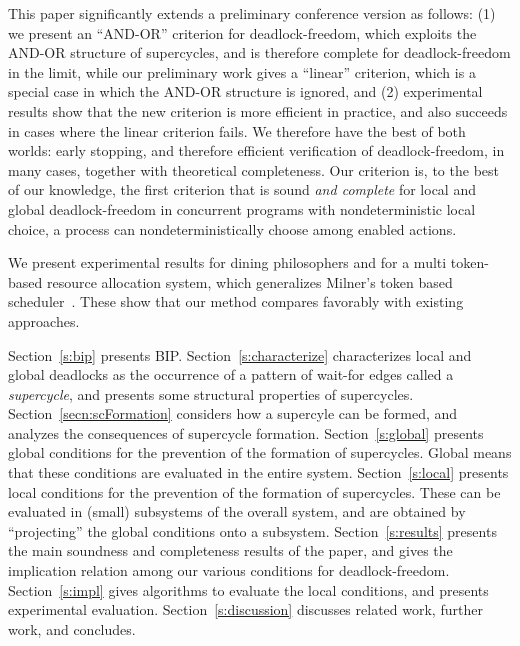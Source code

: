 This paper significantly extends a preliminary conference version \cite{FORTE13} as
follows: 
(1) we present an ``AND-OR'' criterion for deadlock-freedom, which exploits the AND-OR structure of supercycles, and is therefore complete for
deadlock-freedom in the limit, while our preliminary work \cite{FORTE13} gives a ``linear'' criterion, which is a special case in which the AND-OR structure is ignored, and
(2) experimental results show that the new criterion is more efficient
in practice, and also succeeds in cases where the linear criterion
fails.
We therefore have the best of both worlds: early stopping, and
therefore efficient verification of deadlock-freedom, in many cases,
together with theoretical completeness.
%
Our criterion is, to the best of our knowledge, the first criterion that is sound \emph{and complete} for local and global deadlock-freedom in
concurrent programs with nondeterministic local choice, \ie a process can nondeterministically choose among enabled actions.

We present experimental results for dining philosophers and for a multi token-based resource allocation system, which generalizes Milner's token based
scheduler~\cite{milner}.  These show that our method compares favorably with existing approaches.







Section~\ref{s:bip} presents BIP.  
Section~\ref{s:characterize} characterizes local and global
deadlocks as the occurrence of a pattern of wait-for edges called a
\emph{supercycle}, and presents some structural properties of supercycles.
Section~\ref{secn:scFormation} considers how a supercyle can be
formed, and analyzes the consequences of supercycle formation.
Section~\ref{s:global} presents global conditions for the prevention
of the formation of supercycles. Global means that these conditions
are evaluated in the entire system.
Section~\ref{s:local} presents local conditions for the prevention of 
the formation of supercycles. These can be evaluated in (small)
subsystems of the overall system, and are obtained by ``projecting''
the global conditions onto a subsystem.
Section~\ref{s:results} presents the main soundness and completeness
results of the paper, and gives the implication relation among our
various conditions for deadlock-freedom.
Section~\ref{s:impl} gives algorithms to evaluate the local
conditions, and presents experimental evaluation.
Section~\ref{s:discussion} discusses related work, further work, and concludes.
